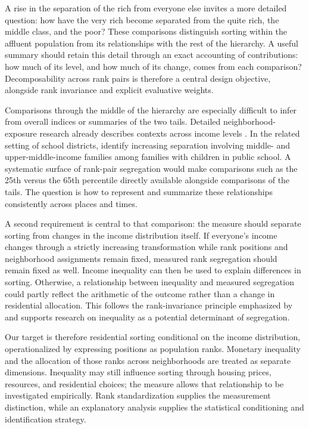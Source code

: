 \documentclass[11pt]{article}
\begin{document}
A rise in the separation of the rich from everyone else invites a more detailed question: how have the very rich become separated from the quite rich, the middle class, and the poor? These comparisons distinguish sorting within the affluent population from its relationships with the rest of the hierarchy. A useful summary should retain this detail through an exact accounting of contributions: how much of its level, and how much of its change, comes from each comparison? Decomposability across rank pairs is therefore a central design objective, alongside rank invariance and explicit evaluative weights.

Comparisons through the middle of the hierarchy are especially difficult to infer from overall indices or summaries of the two tails. Detailed neighborhood-exposure research already describes contexts across income levels \citep{reardonfox2015}. In the related setting of school districts, \citet{owens2016} identify increasing separation involving middle- and upper-middle-income families among families with children in public school. A systematic surface of rank-pair segregation would make comparisons such as the 25th versus the 65th percentile directly available alongside comparisons of the tails. The question is how to represent and summarize these relationships consistently across places and times.

A second requirement is central to that comparison: the measure should separate sorting from changes in the income distribution itself. If everyone's income changes through a strictly increasing transformation while rank positions and neighborhood assignments remain fixed, measured rank segregation should remain fixed as well. Income inequality can then be used to explain differences in sorting. Otherwise, a relationship between inequality and measured segregation could partly reflect the arithmetic of the outcome rather than a change in residential allocation. This follows the rank-invariance principle emphasized by \citet{reardon2011} and supports research on inequality as a potential determinant of segregation.

Our target is therefore residential sorting conditional on the income distribution, operationalized by expressing positions as population ranks. Monetary inequality and the allocation of those ranks across neighborhoods are treated as separate dimensions. Inequality may still influence sorting through housing prices, resources, and residential choices; the measure allows that relationship to be investigated empirically. Rank standardization supplies the measurement distinction, while an explanatory analysis supplies the statistical conditioning and identification strategy.
\end{document}

